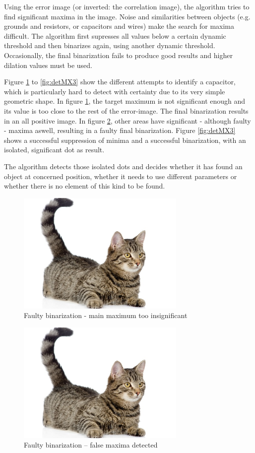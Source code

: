 \documentclass[10pt,twocolumn,letterpaper]{article}
\begin{document}
Using the error image (or inverted: the correlation image), the algorithm tries to find significant maxima in the image. Noise and similarities between objects (e.g. grounds and resistors, or capacitors and wires) make the search for maxima difficult. The algorithm first supresses all values below a certain dynamic threshold and then binarizes again, using another dynamic threshold. Occasionally, the final binarization fails to produce good results and higher dilation values must be used. 
\par
Figure \ref{fig:detMX1} to \ref{fig:detMX3} show the different attempts to identify a capacitor, which is particularly hard to detect with certainty due to its very simple geometric shape. In figure \ref{fig:detMX1}, the target maximum is not significant enough and its value is too close to the rest of the error-image. The final binarization results in an all positive image. In figure \ref{fig:detMX2}, other areas have significant - although faulty - maxima aswell, resulting in a faulty final binarization. Figure \ref{fig:detMX3} shows a successful suppression of minima and a successful binarization, with an isolated, significant dot as result. 
\par
The algorithm detects those isolated dots and decides whether it has found an object at concerned position, whether it needs to use different parameters or whether there is no element of this kind to be found.
\par

\begin{figure}[!ht]
\includegraphics[width = 3.2in]{img/cat.jpg}
\caption{Faulty binarization - main maximum too insignificant}
\label{fig:detMX1}
\end{figure}
\par

\begin{figure}[!ht]
\includegraphics[width = 3.2in]{img/cat.jpg}
\caption{Faulty binarization – false maxima detected}
\label{fig:detMX2}
\end{figure}
\par
\end{document}
